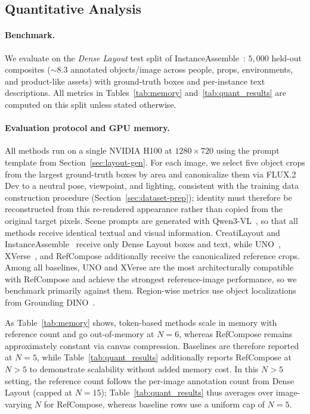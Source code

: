 \documentclass[runningheads]{llncs}
\begin{document}
\subsection{Quantitative Analysis}
\label{sec:quant}

\paragraph{Benchmark.}
We evaluate on the \emph{Dense Layout} test split of InstanceAssemble~\cite{xiang2025instanceassemble}: $5{,}000$ held-out composites ($\sim$8.3 annotated objects/image across people, props, environments, and product-like assets) with ground-truth boxes and per-instance text descriptions.
All metrics in Tables~\ref{tab:memory} and~\ref{tab:quant_results} are computed on this split unless stated otherwise.


\paragraph{Evaluation protocol and GPU memory.}
All methods run on a single NVIDIA H100 at \(1280 \times 720\) using the prompt template from Section~\ref{sec:layout-gen}. For each image, we select five object crops from the largest ground-truth boxes by area and canonicalize them via FLUX.2 Dev to a neutral pose, viewpoint, and lighting, consistent with the training data construction procedure (Section~\ref{sec:dataset-prep}); identity must therefore be reconstructed from this re-rendered appearance rather than copied from the original target pixels. Scene prompts are generated with Qwen3-VL~\cite{qwen3vl}, so that all methods receive identical textual and visual information. CreatiLayout and InstanceAssemble~\cite{xiang2025instanceassemble} receive only Dense Layout boxes and text, while UNO~\cite{wu2025uno}, XVerse~\cite{xverse2024}, and RefCompose additionally receive the canonicalized reference crops. Among all baselines, UNO and XVerse are the most architecturally compatible with RefCompose and achieve the strongest reference-image performance, so we benchmark primarily against them. Region-wise metrics use object localizations from Grounding DINO~\cite{liu2023grounding}.

As Table~\ref{tab:memory} shows, token-based methods scale in memory with reference count and go out-of-memory at \(N=6\), whereas RefCompose remains approximately constant via canvas compression. Baselines are therefore reported at \(N{=}5\), while Table~\ref{tab:quant_results} additionally reports RefCompose at \(N{>}5\) to demonstrate scalability without added memory cost. In this \(N{>}5\) setting, the reference count follows the per-image annotation count from Dense Layout (capped at \(N=15\)); Table~\ref{tab:quant_results} thus averages over image-varying \(N\) for RefCompose, whereas baseline rows use a uniform cap of \(N{=}5\).
\end{document}

